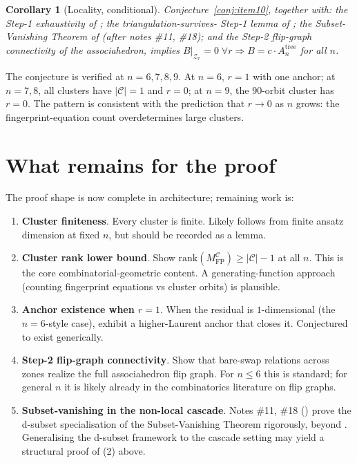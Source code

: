 \documentclass[11pt]{article}
\newtheorem{cor}[thm]{Corollary}
\theoremstyle{definition}
\begin{document}
\begin{cor}[Locality, conditional]\label{cor:locality}
Conjecture~\ref{conj:item10}, together with: the Step-1
exhaustivity of \cite[\S2]{step1stats}; the triangulation-survives-
Step-1 lemma of \cite{tri-survives}; the Subset-Vanishing Theorem
of \cite{subsetvan} (after notes \#11, \#18); and the Step-2
flip-graph connectivity of the associahedron, implies
$B|_{\mathcal Z_r}=0\;\forall r\Rightarrow B=c\cdot A_n^{\mathrm{tree}}$
for all $n$.
\end{cor}

The conjecture is verified at $n=6,7,8,9$. At $n=6$, $r=1$ with one
anchor; at $n=7,8$, all clusters have $|\mathcal C|=1$ and $r=0$;
at $n=9$, the $90$-orbit cluster has $r=0$. The pattern is
consistent with the prediction that $r\to 0$ as $n$ grows: the
fingerprint-equation count overdetermines large clusters.

\section{What remains for the proof}\label{sec:remaining}

The proof shape is now complete in architecture; remaining work is:

\begin{enumerate}[leftmargin=*,topsep=2pt,itemsep=2pt]
\item \textbf{Cluster finiteness}. Every cluster is finite. Likely
follows from finite ansatz dimension at fixed $n$, but should be
recorded as a lemma.

\item \textbf{Cluster rank lower bound}. Show
$\mathrm{rank}(M_{\mathrm{FP}}^{\mathcal C})\ge|\mathcal C|-1$ at
all $n$. This is the core combinatorial-geometric content. A
generating-function approach (counting fingerprint equations vs
cluster orbits) is plausible.

\item \textbf{Anchor existence when $r=1$}. When the residual is
$1$-dimensional (the $n=6$-style case), exhibit a higher-Laurent
anchor that closes it. Conjectured to exist generically.

\item \textbf{Step-2 flip-graph connectivity}. Show that bare-swap
relations across zones realize the full associahedron flip graph.
For $n\le 6$ this is standard; for general $n$ it is likely already
in the combinatorics literature on flip graphs.

\item \textbf{Subset-vanishing in the non-local cascade}. Notes
\#11, \#18 (\cite{notes11,notes18}) prove the d-subset
specialisation of the Subset-Vanishing Theorem rigorously, beyond
\cite[Appx~A]{Rodina}. Generalising the d-subset framework to the
cascade setting may yield a structural proof of (2) above.
\end{enumerate}
\end{document}
